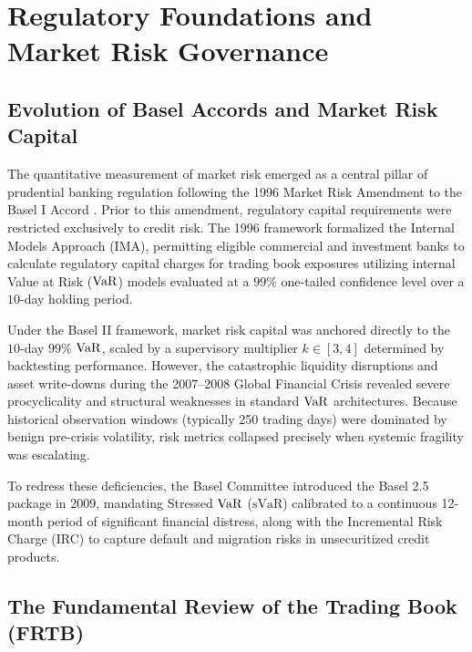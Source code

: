 
\section{Regulatory Foundations and Market Risk Governance}
\label{sec:regulatory_foundations}

\subsection{Evolution of Basel Accords and Market Risk Capital}

The quantitative measurement of market risk emerged as a central pillar of prudential banking regulation following the 1996 Market Risk Amendment to the Basel I Accord \citep{bcbs1996amendment}. Prior to this amendment, regulatory capital requirements were restricted exclusively to credit risk. The 1996 framework formalized the Internal Models Approach (IMA), permitting eligible commercial and investment banks to calculate regulatory capital charges for trading book exposures utilizing internal Value at Risk ($\operatorname{VaR}$) models evaluated at a $99\%$ one-tailed confidence level over a $10$-day holding period.

Under the Basel II framework, market risk capital was anchored directly to the $10$-day $99\%$ $\operatorname{VaR}$, scaled by a supervisory multiplier $k \in [3, 4]$ determined by backtesting performance. However, the catastrophic liquidity disruptions and asset write-downs during the 2007--2008 Global Financial Crisis revealed severe procyclicality and structural weaknesses in standard $\operatorname{VaR}$ architectures. Because historical observation windows (typically 250 trading days) were dominated by benign pre-crisis volatility, risk metrics collapsed precisely when systemic fragility was escalating.

To redress these deficiencies, the Basel Committee introduced the Basel 2.5 package in 2009, mandating Stressed $\operatorname{VaR}$ ($\text{sVaR}$) calibrated to a continuous 12-month period of significant financial distress, along with the Incremental Risk Charge (IRC) to capture default and migration risks in unsecuritized credit products.

\subsection{The Fundamental Review of the Trading Book (FRTB)}

